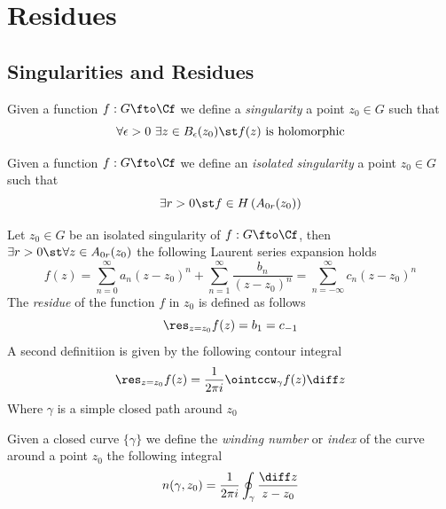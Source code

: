 \documentclass[../mmf.tex]{subfiles}
\begin{document}
\section{Residues}
\subsection{Singularities and Residues}
\begin{dfn}[Singularity]
	Given a function $f:G\fto\Cf$ we define a \textit{singularity} a point $z_0\in G$ such that
	\begin{equation}
		\forall\epsilon>0\ \exists z\in B_\epsilon(z_0)\st f(z)\text{ is holomorphic}
		\label{eq:singularity1}
	\end{equation}
\end{dfn}
\begin{dfn}
	Given a function $f:G\fto\Cf$ we define an \textit{isolated singularity} a point $z_0\in G$ such that
	\begin{equation}
		\exists r>0\st f\in H\left( A_{0r}(z_0) \right)
		\label{eq:isolatedsing}
	\end{equation}
\end{dfn}
\begin{dfn}[Residue]
	Let $z_0\in G$ be an isolated singularity of $f:G\fto\Cf$, then $\exists r>0\st\forall z\in A_{0r}(z_0)$ the following Laurent series expansion holds
	\begin{equation*}
		f(z)=\sum_{n=0}^{\infty}a_n(z-z_0)^n+\sum_{n=1}^{\infty}\frac{b_n}{(z-z_0)^n}=\sum_{n=-\infty}^{\infty}c_n(z-z_0)^n
	\end{equation*}
	The \textit{residue} of the function $f$ in $z_0$ is defined as follows
	\begin{equation}
		\res_{z=z_0}f(z)=b_1=c_{-1}
		\label{eq:residue}
	\end{equation}
	A second definitiion is given by the following contour integral
	\begin{equation*}
		\res_{z=z_0}f(z)=\frac{1}{2\pi i}\ointccw_\gamma f(z)\diff z
	\end{equation*}
	Where $\gamma$ is a simple closed path around $z_0$
\end{dfn}
\begin{dfn}
	Given a closed curve $\{\gamma\}$ we define the \textit{winding number} or \textit{index} of the curve around a point $z_0$ the following integral
	\begin{equation}
		n(\gamma,z_0)=\frac{1}{2\pi i}\oint_\gamma\frac{\diff z}{z-z_0}
		\label{eq:windingnumber}
	\end{equation}
\end{dfn}
\end{document}
